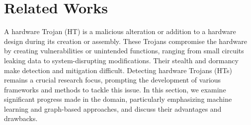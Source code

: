 \section{Related Works}
\label{sec:background} 


A hardware Trojan (HT) is a malicious alteration or addition to a hardware design during its creation or assembly. These Trojans compromise the hardware by creating vulnerabilities or unintended functions, ranging from small circuits leaking data to system-disrupting modifications. Their stealth and dormancy make detection and mitigation difficult. 
Detecting hardware Trojans (HTs) remains a crucial research focus, prompting the development of various frameworks and methods to tackle this issue. In this section, we examine significant progress made in the domain, particularly emphasizing machine learning and graph-based approaches, and discuss their advantages and drawbacks. 

